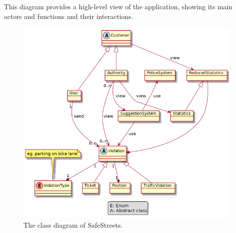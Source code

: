 This diagram provides a high-level view of the application, showing its main actors and functions and their interactions.
\begin{figure}[htp]
	\centering
	\includegraphics[width=\textwidth]{images/Class Diagram.png}
	\caption{The class diagram of SafeStreets.}
	\label{fig:class-diagram}
\end{figure}
